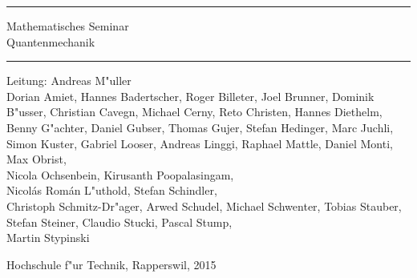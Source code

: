 \documentclass{book}
\begin{document}
\pagestyle{fancy}
\frontmatter
\newcommand\HRule{\noindent\rule{\linewidth}{1.5pt}}
\begin{titlepage}
\HRule
\vspace*{5pt}
\begin{flushright}
{
\LARGE
Mathematisches Seminar\\
\vspace*{20pt}
\Huge
Quantenmechanik%
}
\vspace*{5pt}
\end{flushright}
\HRule
\begin{flushright}
\vspace{60pt}
\Large
Leitung: Andreas M"uller\\
\vspace{40pt}
\Large
Dorian Amiet,
Hannes Badertscher,
Roger Billeter,
Joel Brunner,
Dominik B"usser,
Christian Cavegn,
Michael Cerny,
Reto Christen,
Hannes Diethelm,
Benny G"achter,
Daniel Gubser,
Thomas Gujer,
Stefan Hedinger,
Marc Juchli,
Simon Kuster,
Gabriel Looser,
Andreas Linggi,
Raphael Mattle,
Daniel Monti,
Max Obrist,\\
Nicola Ochsenbein,
Kirusanth Poopalasingam,\\
Nicol\'as Rom\'an L"uthold,
Stefan Schindler,\\
Christoph Schmitz-Dr"ager,
Arwed Schudel,
Michael Schwenter,
Tobias Stauber,
Stefan Steiner,
Claudio Stucki,
Pascal Stump,\\
Martin Stypinski
\end{flushright}
\begin{center}
Hochschule f"ur Technik, Rapperswil, 2015
\end{center}
\end{titlepage}
\hypersetup{
    colorlinks=true,
    linktoc=all,
    linkcolor=blue
}
\newenvironment{beispiele}{
\bgroup\smallskip\parindent0pt\bf Beispiele\egroup

\begin{list}{\arabic{beispiel}.}
  {\usecounter{beispiel}
  \setlength{\labelsep}{5mm}
  \setlength{\rightmargin}{0pt}
}}{\end{list}}
\newenvironment{uebungsaufgaben}{
\begin{list}{\arabic{uebungsaufgabe}.}
  {\usecounter{uebungsaufgabe}
  \setlength{\labelwidth}{2cm}
  \setlength{\leftmargin}{0pt}
  \setlength{\labelsep}{5mm}
  \setlength{\rightmargin}{0pt}
  \setlength{\itemindent}{0pt}
}}{\end{list}\vfill\pagebreak}
\end{document}

